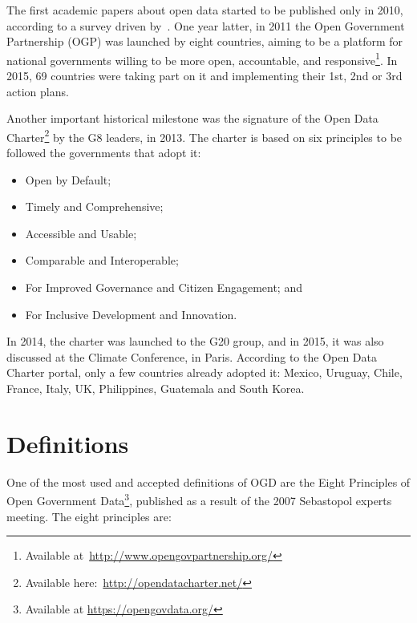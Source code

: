 The first academic papers about open data started to be published only in 2010, according to a survey driven by~. One year latter, in 2011 the Open Government Partnership (OGP) was launched by eight countries, aiming to be a platform for national governments willing to be more open, accountable, and responsive\footnote{Available at~\url{http://www.opengovpartnership.org/}}. 
In 2015, 69 countries were taking part on it and implementing their 1st, 2nd or 3rd action plans.

Another important historical milestone was the signature of the Open Data Charter\footnote{Available here:~\url{http://opendatacharter.net/}} by the G8 leaders, in 2013. The charter is based on six principles to be followed the governments that adopt it:

\begin{itemize}
	\item Open by Default;
    \item Timely and Comprehensive;
    \item Accessible and Usable;
	\item Comparable and Interoperable;
    \item For Improved Governance and Citizen Engagement; and
    \item For Inclusive Development and Innovation.
\end{itemize}

In 2014, the charter was launched to the G20 group, and in 2015, it was also discussed at the Climate Conference, in Paris.
According to the Open Data Charter portal, only a few countries already adopted it: Mexico, Uruguay, Chile, France, Italy, UK, Philippines, Guatemala and South Korea.


\section{Definitions}
\label{sec:definitions}

One of the most used and accepted definitions of OGD are the Eight Principles of Open Government Data\footnote{Available at \url{https://opengovdata.org/}}, published as a result of the 2007 Sebastopol experts meeting. The eight principles are: 

